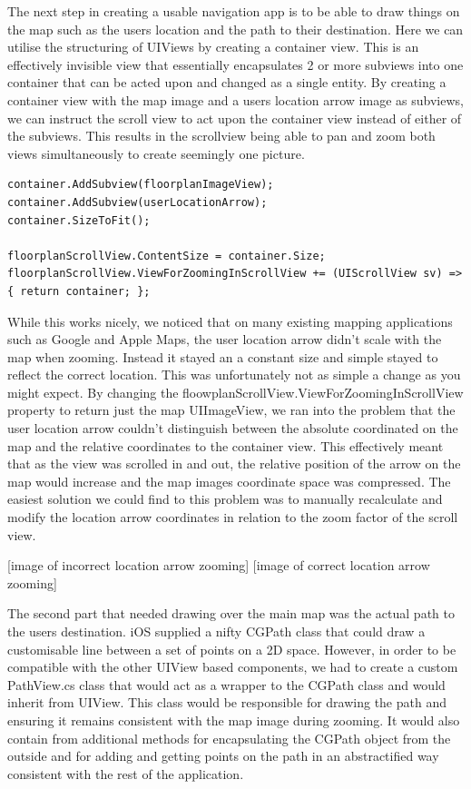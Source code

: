 \documentclass[main.tex]{subfiles}
\begin{document}
The next step in creating a usable navigation app is to be able to draw things on the map such as the users location and the path to their destination. Here we can utilise the structuring of UIViews by creating a container view. This is an effectively invisible view that essentially encapsulates 2 or more subviews into one container that can be acted upon and changed as a single entity. By creating a container view with the map image and a users location arrow image as subviews, we can instruct the scroll view to act upon the container view instead of either of the subviews. This results in the scrollview being able to pan and zoom both views simultaneously to create seemingly one picture. 
\begin{lstlisting}
container.AddSubview(floorplanImageView);
container.AddSubview(userLocationArrow);
container.SizeToFit();

floorplanScrollView.ContentSize = container.Size;
floorplanScrollView.ViewForZoomingInScrollView += (UIScrollView sv) => { return container; };
\end{lstlisting}
While this works nicely, we noticed that on many existing mapping applications such as Google and Apple Maps, the user location arrow didn’t scale with the map when zooming. Instead it stayed an a constant size and simple stayed to reflect the correct location. This was unfortunately not as simple a change as you might expect. By changing the floowplanScrollView.ViewForZoomingInScrollView property to return just the map UIImageView, we ran into the problem that the user location arrow couldn’t distinguish between the absolute coordinated on the map and the relative coordinates to the container view. This effectively meant that as the view was scrolled in and out, the relative position of the arrow on the map would increase and the map images coordinate space was compressed. The easiest solution we could find to this problem was to manually recalculate and modify the location arrow coordinates in relation to the zoom factor of the scroll view.


[image of incorrect location arrow zooming]
[image of correct location arrow zooming]



The second part that needed drawing over the main map was the actual path to the users destination. iOS supplied a nifty CGPath class that could draw a customisable line between a set of points on a 2D space. However, in order to be compatible with the other UIView based components, we had to create a custom PathView.cs class that would act as a wrapper to the CGPath class and would inherit from UIView. This class would be responsible for drawing the path and ensuring it remains consistent with the map image during zooming. It would also contain from additional methods for encapsulating the CGPath object from the outside and for adding and getting points on the path in an abstractified way consistent with the rest of the application.
\end{document}
